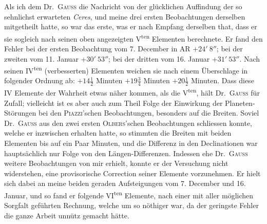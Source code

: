 Als ich dem Dr.\ \textsc{Gauss} die Nachricht von der glücklichen Auffindung der so sehnlichst erwarteten \textit{Ceres}, und meine drei ersten Beobachtungen derselben mitgetheilt hatte, so war das erste, was er nach Empfang derselben that, dass er sie sogleich nach seinen oben angezeigten V\textsuperscript{ten} Elementen berechnete. Er fand den Fehler bei der ersten Beobachtung vom 7. December in AR $+24'\ 8''$; bei der zweiten vom 11. Januar $+30'\ 53''$; bei der dritten vom 16. Januar $+31'\ 53''$. Nach seinen IV\textsuperscript{ten} (verbesserten) Elementen weichen sie nach einem Überschlage in folgender Ordnung ab: $+14\frac12$ Minuten $+19\frac34$ Minuten $+20\frac12$ Minuten. Dass diese IV Elemente der Wahrheit etwas näher kommen, als die V\textsuperscript{ten}, hält Dr.\ \textsc{Gauss} für Zufall; vielleicht ist es aber auch zum Theil Folge der Einwirkung der Planeten-Störungen bei den \textsc{Piazzi}'schen Beobachtungen, besonders auf die Breiten. Soviel Dr.\ \textsc{Gauss} aus den zwei ersten \textsc{Olbers}'schen Beobachtungen schliessen konnte, welche er inzwischen erhalten hatte, so stimmten die Breiten mit beiden Elementen bis auf ein Paar Minuten, und die Differenz in den Declinationen war hauptsächlich nur Folge von den Längen-Differenzen. Indessen ehe Dr.\ \textsc{Gauss} weitere Beobachtungen von mir erhielt, konnte er der Versuchung nicht widerstehen, eine provisorische Correction seiner Elemente vorzunehmen. Er hielt sich dabei an meine beiden geraden Aufsteigungen vom 7. December und 16. Januar, und so fand er folgende VI\textsuperscript{ten} Elemente, nach einer mit aller möglichen Sorgfalt geführten Rechnung, welche um so nöthiger war, da der geringste Fehler die ganze Arbeit unnütz gemacht hätte.
